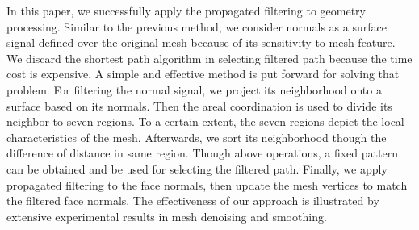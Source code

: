 In this paper, we successfully apply the propagated filtering to geometry processing.
Similar to the previous method, we consider normals as a surface signal defined over the original mesh because of its sensitivity to mesh feature.
We discard the shortest path algorithm in selecting filtered path because the time cost is expensive.
A simple and effective method is put forward for solving that problem.
For filtering the normal signal, we project its neighborhood onto a surface based on its normals.
Then the areal coordination is used to divide its neighbor to seven regions. To a certain extent, the seven regions depict the local characteristics of the mesh.
Afterwards, we sort its neighborhood though the difference of distance in same region.
Though above operations, a fixed pattern can be obtained and be used for selecting the filtered path.
Finally, we apply propagated filtering to the face normals, then update the mesh vertices to match the filtered face normals.
The effectiveness of our approach is illustrated by extensive experimental results in mesh denoising and smoothing.